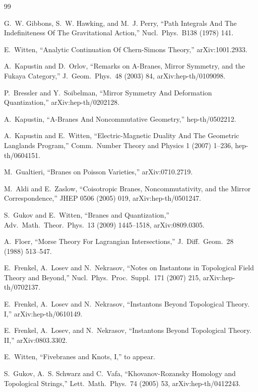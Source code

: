 \documentclass[11pt,a4paper,UTF8]{ctexart}
\theoremstyle{plain}
\theoremstyle{definition}
\begin{document}
\begin{thebibliography}{99}

 G.~W. Gibbons, S.~W. Hawking, and M.~J. Perry,
  ``Path Integrals And The Indefiniteness Of The Gravitational Action,''
  Nucl.\ Phys.\ B138 (1978) 141.

 E.~Witten, ``Analytic Continuation Of Chern-Simons Theory,''
  arXiv:1001.2933.

 A.~Kapustin and D.~Orlov, ``Remarks on A-Branes, Mirror Symmetry,
  and the Fukaya Category,'' J.\ Geom.\ Phys.\ 48 (2003) 84,
  arXiv:hep-th/0109098.

 P.~Bressler and Y.~Soibelman, ``Mirror Symmetry And Deformation
  Quantization,'' arXiv:hep-th/0202128.

 A.~Kapustin, ``A-Branes And Noncommutative Geometry,''
  hep-th/0502212.

 A.~Kapustin and E.~Witten, ``Electric-Magnetic Duality And The
  Geometric Langlands Program,'' Comm.\ Number Theory and Physics 1 (2007)
  1--236, hep-th/0604151.

 M.~Gualtieri, ``Branes on Poisson Varieties,'' arXiv:0710.2719.

 M.~Aldi and E.~Zaslow, ``Coisotropic Branes, Noncommutativity, and
  the Mirror Correspondence,'' JHEP 0506 (2005) 019, arXiv:hep-th/0501247.

 S.~Gukov and E.~Witten, ``Branes and Quantization,''
  Adv.\ Math.\ Theor.\ Phys.\ 13 (2009) 1445--1518, arXiv:0809.0305.

 A.~Floer, ``Morse Theory For Lagrangian Intersections,''
  J.\ Diff.\ Geom.\ 28 (1988) 513--547.

 E.~Frenkel, A.~Losev and N.~Nekrasov, ``Notes on Instantons in
  Topological Field Theory and Beyond,'' Nucl.\ Phys.\ Proc.\ Suppl.\ 171
  (2007) 215, arXiv:hep-th/0702137.

 E.~Frenkel, A.~Losev and N.~Nekrasov, ``Instantons Beyond
  Topological Theory. I,'' arXiv:hep-th/0610149.

 E.~Frenkel, A.~Losev, and N.~Nekrasov, ``Instantons Beyond
  Topological Theory. II,'' arXiv:0803.3302.

 E.~Witten, ``Fivebranes and Knots, I,'' to appear.

 S.~Gukov, A.~S. Schwarz and C.~Vafa, ``Khovanov-Rozansky Homology
  and Topological Strings,'' Lett.\ Math.\ Phys.\ 74 (2005) 53,
  arXiv:hep-th/0412243.


\end{thebibliography}
\end{document}
